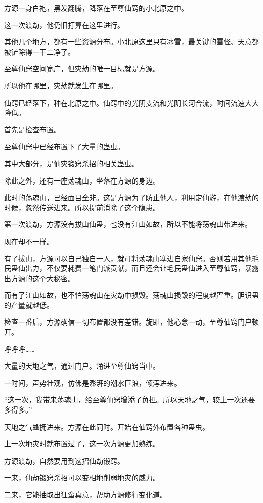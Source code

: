 
\begin{this_body}

方源一身白袍，黑发翻腾，降落在至尊仙窍的小北原之中。

这一次渡劫，他仍旧打算在这里进行。

其他几个地方，都有一些资源分布。小北原这里只有冰雪，最关键的雪怪、天意都被铲除得一干二净了。

至尊仙窍空间宽广，但灾劫的唯一目标就是方源。

所以他在哪里，灾劫就发生在哪里。

仙窍已经落下，种在北原之中。仙窍中的光阴支流和光阴长河合流，时间流速大大降低。

首先是检查布置。

至尊仙窍中已经布置下了大量的蛊虫。

其中大部分，是仙灾锻窍杀招的相关蛊虫。

除此之外，还有一座荡魂山，坐落在方源的身边。

此时的荡魂山，已经面目全非。这是方源为了防止他人，利用定仙游，在他渡劫的时候，忽然传送进来。所以提前消除了这个隐患。

第一次渡劫，方源没有拔山仙蛊，也没有江山如故，所以不能将荡魂山带进来。

现在却不一样。

有了拔山，方源可以自己独自一人，就可将荡魂山塞进自家仙窍。否则若用其他毛民蛊仙出力，不仅要耗费一笔门派贡献，而且还会让毛民蛊仙进入至尊仙窍，暴露出方源的这个大秘密。

而有了江山如故，也不怕荡魂山在灾劫中损毁。荡魂山损毁的程度越严重。胆识蛊的产量就越低。

检查一番后，方源确信一切布置都没有差错。旋即，他心念一动，至尊仙窍门户顿开。

呼呼呼……

大量的天地之气，通过门户。涌进至尊仙窍当中。

一时间，声势壮观，仿佛是澎湃的潮水巨浪，倾泻进来。

“这一次，我带来荡魂山，给至尊仙窍增添了负担。所以天地之气，较上一次还要多得多。”

天地之气蜂拥进来。方源在此同时。开始在仙窍外布置各种蛊虫。

上一次地灾时就布置过了，这一次方源更加熟练。

方源渡劫，自然要用到这招仙劫锻窍。

一来，仙劫锻窍杀招可以变相地削弱地灾的威力。

二来，它能抽取出狂蛮真意，帮助方源修行变化道。


\end{this_body}
